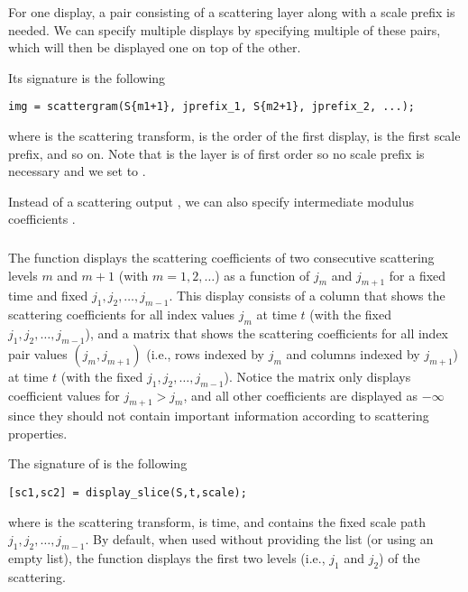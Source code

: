 \documentclass{article}
\begin{document}
For one display, a pair consisting of a scattering layer along with a scale prefix is needed. We can specify multiple displays by specifying multiple of these pairs, which will then be displayed one on top of the other.

Its signature is the following
\begin{lstlisting}
img = scattergram(S{m1+1}, jprefix_1, S{m2+1}, jprefix_2, ...);
\end{lstlisting}
where  is the scattering transform,  is the order of the first display,  is the first scale prefix, and so on. Note that is  the layer is of first order so no scale prefix is necessary and we set  to \mcode{[]}.

Instead of a scattering output , we can also specify intermediate modulus coefficients .

\subsubsection{}

The  function displays the scattering coefficients of two consecutive scattering levels $m$ and $m+1$ (with $m = 1, 2, \ldots$) as a function of $j_m$ and $j_{m+1}$ for a fixed time and fixed $j_1, j_2, \ldots, j_{m-1}$. This display consists of a column that shows the scattering coefficients for all index values $j_m$ at time $t$ (with the fixed $j_1, j_2, \ldots, j_{m-1}$), and a matrix that shows the scattering coefficients for all index pair values $(j_m,j_{m+1})$ (i.e., rows indexed by $j_m$ and columns indexed by $j_{m+1}$) at time $t$ (with the fixed $j_1, j_2, \ldots, j_{m-1}$). Notice the matrix only displays coefficient values for $j_{m+1} > j_m$, and all other coefficients are displayed as $-\infty$ since they should not contain important information according to scattering properties.

The signature of  is the following
\begin{lstlisting}
[sc1,sc2] = display_slice(S,t,scale);
\end{lstlisting}
where  is the scattering transform,  is time, and  contains the fixed scale path $j_1, j_2, \ldots, j_{m-1}$. By default, when used without providing the  list (or using an empty list), the function displays the first two levels (i.e., $j_1$ and $j_2$) of the scattering.
\end{document}
